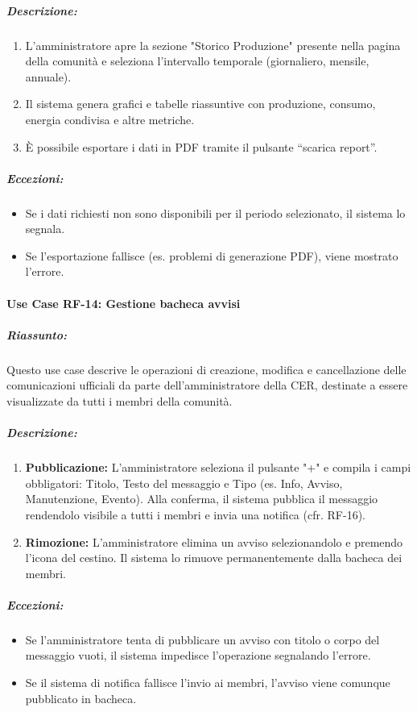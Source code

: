 \subparagraph*{Descrizione:}
\begin{enumerate}
    \item L’amministratore apre la sezione "Storico Produzione" presente nella pagina  della comunità e seleziona l’intervallo temporale (giornaliero, mensile, annuale).
    \item Il sistema genera grafici e tabelle riassuntive con produzione, consumo, energia condivisa e altre metriche.
    \item È possibile esportare i dati in PDF tramite il pulsante ``scarica report''.
\end{enumerate}

\subparagraph*{Eccezioni:}
\begin{itemize}
    \item Se i dati richiesti non sono disponibili per il periodo selezionato, il sistema lo segnala.
    \item Se l’esportazione fallisce (es. problemi di generazione PDF), viene mostrato l’errore.
\end{itemize}

\paragraph*{Use Case RF-14: Gestione bacheca avvisi}
\subparagraph*{Riassunto:}
Questo use case descrive le operazioni di creazione, modifica e cancellazione delle comunicazioni ufficiali da parte dell'amministratore della CER, destinate a essere visualizzate da tutti i membri della comunità.

\subparagraph*{Descrizione:}
\begin{enumerate}
    \item \textbf{Pubblicazione:} L'amministratore seleziona il pulsante "+" e compila i campi obbligatori: Titolo, Testo del messaggio e Tipo (es. Info, Avviso, Manutenzione, Evento). Alla conferma, il sistema pubblica il messaggio rendendolo visibile a tutti i membri e invia una notifica (cfr. RF-16).
    \item \textbf{Rimozione:} L'amministratore elimina un avviso selezionandolo e premendo l'icona del cestino. Il sistema lo rimuove permanentemente dalla bacheca dei membri.
\end{enumerate}

\subparagraph*{Eccezioni:}
\begin{itemize}
    \item Se l'amministratore tenta di pubblicare un avviso con titolo o corpo del messaggio vuoti, il sistema impedisce l'operazione segnalando l'errore.
    \item Se il sistema di notifica fallisce l'invio ai membri, l'avviso viene comunque pubblicato in bacheca.
\end{itemize}

